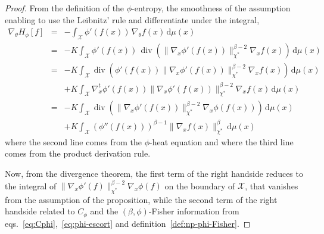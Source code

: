 \documentclass[entropy,article,submit,moreauthors,pdftex]{Definitions/mdpi}
\def\dmu{\mathrm{d}\mu}%
\def\X{\mathcal{X}}%
\def\div{\operatorname{div}}%
\begin{document}
\begin{proof}
  From the  definition of the  $\phi$-entropy, the smoothness of  the assumption
  enabling to use the Leibnitz' rule and differentiate under the integral,
  \begin{eqnarray*}
  \displaystyle \nabla_\theta H_\phi[f] & = & \displaystyle - \int_\X
  \phi'(f(x)) \, \nabla_\theta f(x) \, \dmu(x)
  \\[2.5mm]
  & = & \displaystyle - K \int_\X \phi'(f(x)) \, \div\left( \| \nabla_x
  \phi'(f(x)) \|_{\chi^*}^{\beta-2} \nabla_x f(x) \right) \, \dmu(x)
  \\[2.5mm]
  & = & \displaystyle - K \int_\X \div\left( \phi'(f(x)) \| \nabla_x \phi'(f(x))
  \|_{\chi^*}^{\beta-2} \nabla_x f(x) \right) \, \dmu(x)
  \\[2.5mm]
  & & \displaystyle + K \int_\X \nabla_x^t
  \phi'(f(x)) \| \nabla_x \phi'(f(x)) \|_{\chi^*}^{\beta-2} \nabla_x f(x) \,
  \dmu(x)
  \\[2.5mm]
  & = & \displaystyle - K \int_\X \div\left( \| \nabla_x \phi'(f(x))
  \|_{\chi^*}^{\beta-2} \nabla_x \phi(f(x)) \right) \, \dmu(x)
  \\[2.5mm]
  & & \displaystyle  + K \int_\X
  \left( \phi''(f(x)) \right)^{\beta-1} \| \nabla_x f(x) \|_{\chi^*}^\beta \,
  \dmu(x)
  \end{eqnarray*}
  where the second line comes from  the $\phi$-heat equation and where the third
  line comes from the product derivation rule.

  Now, from the divergence theorem, the first term of the right handside reduces
  to  the  integral  of  $\| \nabla_x  \phi'(f)  \|_{\chi^*}^{\beta-2}  \nabla_x
  \phi(f)$ on  the boundary of  $\X$, that vanishes  from the assumption  of the
  proposition, while the  second term of the right handside  related to $C_\phi$
  and         the         $(\beta,\phi)$-Fisher         information         from
  eqs.~\eqref{eq:Cphi},~\eqref{eq:phi-escort}                                and
  definition~\ref{def:np-phi-Fisher}.
\end{proof}
\end{document}

